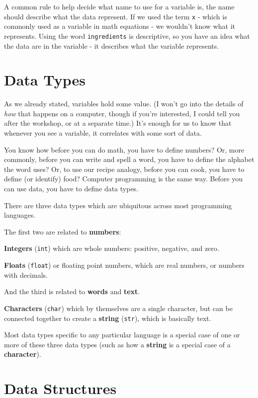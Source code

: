 \documentclass[
]{book}
\begin{document}
A common rule to help decide what name to use for a variable is, the name should describe what the data represent. If we used the term \texttt{x} - which is commonly used as a variable in math equations - we wouldn't know what it represents. Using the word \texttt{ingredients} is descriptive, so you have an idea what the data are in the variable - it describes what the variable represents.

\section{Data Types}\label{data-types-1}

As we already stated, variables hold some value. (I won't go into the details of \emph{how} that happens on a computer, though if you're interested, I could tell you after the workshop, or at a separate time.) It's enough for us to know that whenever you see a variable, it correlates with some sort of data.

You know how before you can do math, you have to define numbers? Or, more commonly, before you can write and spell a word, you have to define the alphabet the word uses? Or, to use our recipe analogy, before you can cook, you have to define (or identify) food? Computer programming is the same way. Before you can use data, you have to define data types.

There are three data types which are ubiquitous across most programming languages.

The first two are related to \textbf{numbers}:

\textbf{Integers} (\texttt{int}) which are whole numbers: positive, negative, and zero.

\textbf{Floats} (\texttt{float}) or floating point numbers, which are real numbers, or numbers with decimals.

And the third is related to \textbf{words} and \textbf{text}.

\textbf{Characters} (\texttt{char}) which by themselves are a single character, but can be connected together to create a \textbf{string} (\texttt{str}), which is basically text.

Most data types specific to any particular language is a special case of one or more of these three data types (such as how a \textbf{string} is a special case of a \textbf{character}).

\section{Data Structures}\label{data-structures}
\end{document}
